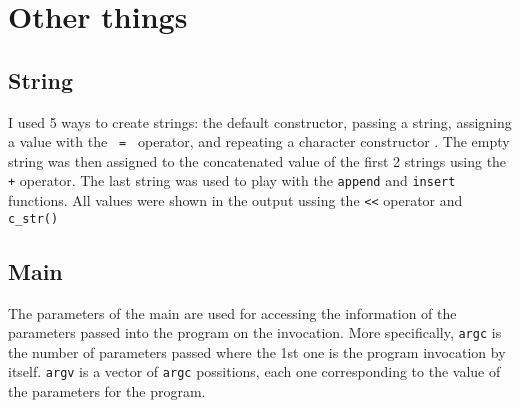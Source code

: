 \documentclass{article}
\begin{document}
\section{Other things}
\subsection{String}
I used 5 ways to create strings: the default constructor, passing a string,
assigning a value with the \verb+ = + operator, and repeating a character 
constructor \cite{cpp}. 
The empty string was then assigned to the concatenated value of
the first 2 strings using the \verb|+| operator. The last string was
used to play with the \verb+append+ and \verb+insert+ functions. 
All values were shown in the output ussing the \verb+<<+ operator and
\verb+c_str()+ 

\subsection{Main}
The parameters of the main are used for accessing the information
of the parameters passed into the program on the invocation.
More specifically, \verb+argc+ is the number of parameters passed 
where the 1st one is the program invocation by itself.
\verb+argv+ is a vector of \verb+argc+ possitions, each one corresponding
to the value of the parameters for the program.



\end{document}
